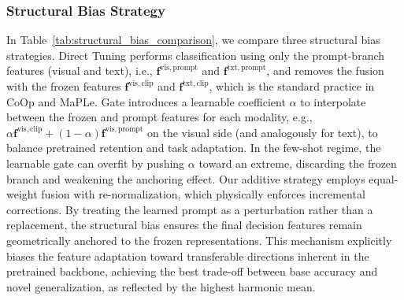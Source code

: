 \documentclass{article}
\theoremstyle{plain}
\theoremstyle{definition}
\theoremstyle{remark}
\begin{document}
	\subsubsection{Structural Bias Strategy}
	\begin{table}[h]
		\caption{Comparison of different structural bias strategies. Our additive structure ensures that the adapted features are geometrically anchored by the pretrained manifold, achieving the best trade-off between base retention and novel generalization.}
		\label{tab:structural_bias_comparison}
		\centering
	\end{table}
	In Table~\ref{tab:structural_bias_comparison}, we compare three structural bias strategies. Direct Tuning performs classification using only the prompt-branch features (visual and text), i.e., $\mathbf{f}^{\mathrm{vis,prompt}}$ and $\mathbf{f}^{\mathrm{txt,prompt}}$, and removes the fusion with the frozen features $\mathbf{f}^{\mathrm{vis,clip}}$ and $\mathbf{f}^{\mathrm{txt,clip}}$, which is the standard practice in CoOp and MaPLe. Gate introduces a learnable coefficient $\alpha$ to interpolate between the frozen and prompt features for each modality, e.g., $\alpha \mathbf{f}^{\mathrm{vis,clip}} + (1-\alpha) \mathbf{f}^{\mathrm{vis,prompt}}$ on the visual side (and analogously for text), to balance pretrained retention and task adaptation. In the few-shot regime, the learnable gate can overfit by pushing $\alpha$ toward an extreme, discarding the frozen branch and weakening the anchoring effect. Our additive strategy employs equal-weight fusion with re-normalization, which physically enforces incremental corrections. By treating the learned prompt as a perturbation rather than a replacement, the structural bias ensures the final decision features remain geometrically anchored to the frozen representations. This mechanism explicitly biases the feature adaptation toward transferable directions inherent in the pretrained backbone, achieving the best trade-off between base accuracy and novel generalization, as reflected by the highest harmonic mean.
\end{document}
